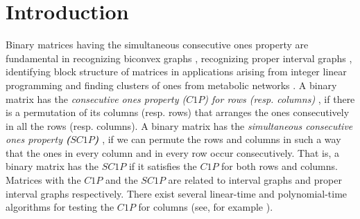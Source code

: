 \documentclass[review, 1p]{elsarticle}
\begin{document}
\section{Introduction}\label{intro}
Binary matrices having the simultaneous consecutive ones property are fundamental in recognizing biconvex graphs \cite{tucker1972structure}, recognizing proper interval graphs \cite{Fis85}, identifying block structure of matrices in applications arising from integer linear programming \cite{oswald2003weighted}  and finding clusters of ones from metabolic networks \cite{konig2006discovering}. A binary matrix  has the \textit{consecutive ones property ($C1P$) for rows (resp. columns)} \cite{fulkerson1965incidence}, if there is a permutation of its columns (resp. rows) that arranges the ones consecutively in all the rows (resp. columns). A binary  matrix has the \textit{simultaneous consecutive ones property} \textbf{\textit{($SC1P$)}}  \cite{oswald2009simultaneous}, if we can permute the rows and columns in such a way that the ones in every column and in every row occur consecutively. That is, a binary matrix has the $SC1P$ if it satisfies the $C1P$ for both rows and columns. Matrices with the $C1P$ and the $SC1P$ are related to interval graphs and proper interval graphs respectively. There exist several linear-time and polynomial-time algorithms for testing the $C1P$ for columns (see, for example \cite{booth1976testing,hsu2002simple,hsu2003pc,mcconnell2004certifying,meidanis1998consecutive,raffinot2011consecutive}). 
\end{document}
